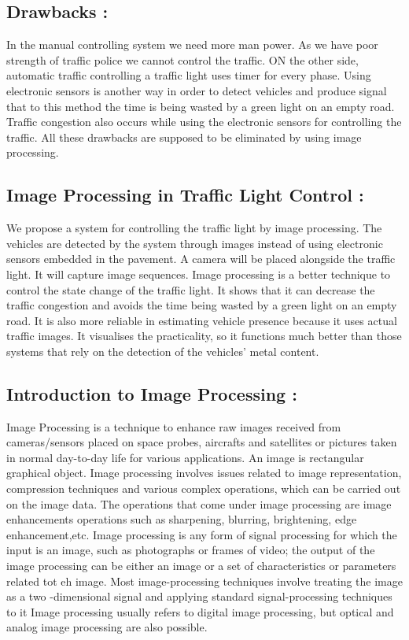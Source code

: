\documentclass[12pt,a4paper,roman]{article}
\begin{document}
{\subsection{\textbf{Drawbacks :}}{
In the manual controlling system we need more man power. As we have poor strength of traffic police we cannot control the traffic. ON the other side, automatic traffic controlling a traffic light uses timer for every phase. Using electronic sensors is another way in order to detect vehicles and produce signal that to this method the time is being wasted by a green light on an empty road. Traffic congestion also occurs while using the electronic sensors for controlling  the traffic. All these drawbacks are supposed to be eliminated by using image processing.}

\subsection{\textbf{Image Processing in Traffic Light Control :}}{
We propose a system for controlling the traffic light by image processing. The vehicles are detected by the system through images instead of using electronic sensors embedded in the pavement. A camera will be placed alongside the traffic light. It will  capture image sequences. Image processing is a better technique to control the state change of the traffic light. It shows that it can decrease the traffic congestion and avoids the time being wasted by a green light on an empty road. It is also more reliable in estimating vehicle presence because it uses actual traffic images. It visualises the practicality, so it functions much better than those systems that rely on the detection of the vehicles' metal content.}

\subsection{
\textbf{Introduction to Image Processing :}}{
Image Processing is a technique to enhance raw images received from cameras/sensors placed on space probes, aircrafts and satellites or pictures taken in normal day-to-day life for various applications. An image is rectangular graphical object. Image processing involves issues related to image representation, compression techniques and various complex operations, which can be carried out on the image data. The operations that come under image processing are image enhancements operations such as sharpening, blurring, brightening, edge enhancement,etc. Image processing is any form of signal processing for which the input is an image, such as photographs or frames of video; the output of the image processing can be either an image or a set of characteristics or parameters related tot eh image. Most image-processing techniques involve treating the image as a two -dimensional signal and applying standard signal-processing techniques to it Image processing usually refers to digital image processing, but optical and analog image processing are also possible.
}
}
\end{document}
